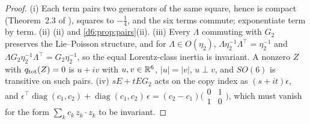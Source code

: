 \begin{proof}
(i) Each term pairs two generators of the same square, hence is compact (Theorem~2.3 of \cite{ES17}), squares to $-\tfrac14$, and the six terms
commute; exponentiate term by term. (ii) (ii) and \cref{d6:prop:pairs}(ii). (iii) Every $\Lambda$ commuting with $G_2$
preserves the Lie--Poisson structure, and for $\Lambda\in O(\eta_2)$, $\Lambda\eta_2^{-1}\Lambda^{\!\top}=\eta_2^{-1}$ and
$\Lambda G_2\eta_2^{-1}\Lambda^{\!\top}=G_2\eta_2^{-1}$, so the equal Lorentz-class inertia is invariant. A nonzero $Z$ with $q_{\rm tot}(Z)=0$ is $u+iv$
with $u,v\in\mathbb{R}^6$, $|u|=|v|$, $u\perp v$, and $SO(6)$ is transitive on such pairs. (iv) $sE+tEG_2$ acts on the copy index as $(s+it)\epsilon$, and
$\epsilon^{\!\top}\operatorname{diag}(c_1,c_2)+\operatorname{diag}(c_1,c_2)\,\epsilon=(c_2-c_1)\bigl(\begin{smallmatrix}0&1\\1&0\end{smallmatrix}\bigr)$, which must vanish for the form $\sum_kc_k\,z_k\cdot z_k$ to be invariant.
\end{proof}

